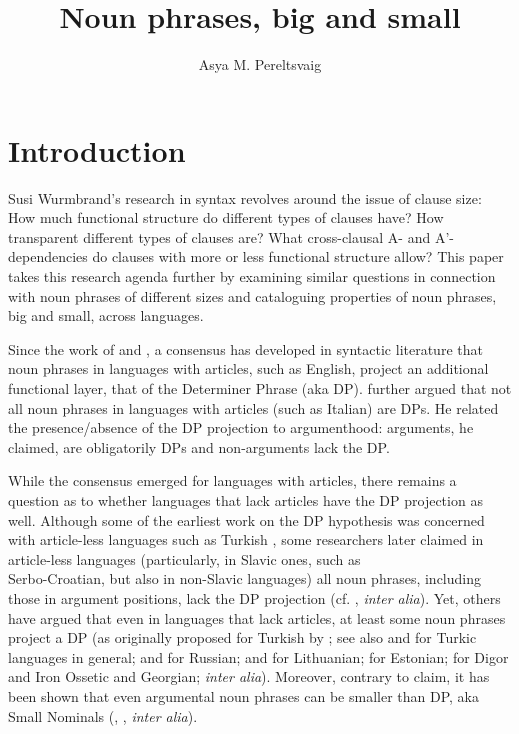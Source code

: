 \documentclass[output=paper]{langsci/langscibook}
\author{Asya M. Pereltsvaig\affiliation{}}
\title{Noun phrases, big and small}
\begin{document}
\maketitle 


\section{Introduction}

Susi Wurmbrand’s research in syntax revolves around the issue of clause size: 
How much functional structure do different types of clauses have? 
How transparent different types of clauses are? 
What cross-clausal A- and A'-dependencies do clauses with more or less functional structure allow? 
This paper takes this research agenda further by examining similar questions in connection with noun phrases of different sizes 
and cataloguing properties of noun phrases, big and small, across languages.

Since the work of \citet{Szabolcsi1983} and \citet{abney1987}, a consensus has developed in syntactic literature 
that noun phrases in languages with articles, such as English, project an additional functional layer, that of the Determiner Phrase (aka DP). 
\citet{Longobardi1994} further argued that not all noun phrases in languages with articles (such as Italian) are DPs. 
He related the presence/absence of the DP projection to argumenthood: arguments, he claimed, are obligatorily DPs and non-arguments lack the DP. 

While the consensus emerged for languages with articles, there remains a question as to whether languages that lack articles have the DP projection as well. 
Although some of the earliest work on the DP hypothesis was concerned with article-less languages such as Turkish \citep{Kornfilt1984}, 
some researchers later claimed in article-less languages (particularly, in Slavic ones, such as\\ Serbo-Croatian, but also in non-Slavic languages) all noun phrases, 
including those in argument positions, lack the DP projection (cf. \citealt{boskovic2008,Boskovic2009,boskovic2012,BoskovicSener2014,Despic2011}, \textit{inter alia}). 
Yet, others have argued that even in languages that lack articles, at least some noun phrases project a DP (as originally proposed for Turkish by \citealt{Kornfilt1984}; 
see also \citealt{LyutikovaPereltsvaig2015} and \citealt{Kornfilt2018b,Kornfilt2018a} for Turkic languages in general; 
\citealt{Progovac1998} and \citealt{Pereltsvaig2001,Pereltsvaig2006,Pereltsvaig2007} for Russian; 
\citealt{VanHofwegen2013} and \citealt{GillonArmoskaite2015} for Lithuanian; 
\citealt{Norris2018} for Estonian; 
\citealt{Erschler2019b,Erschler2019a} for Digor and Iron Ossetic and Georgian; 
\textit{inter alia}). 
Moreover, contrary to  claim, it has been shown that even argumental noun phrases can be smaller than DP, 
aka Small Nominals (\citealt{Pereltsvaig2006}, \citealt{KaganPereltsvaig2011}, \textit{inter alia}). 
\end{document}
